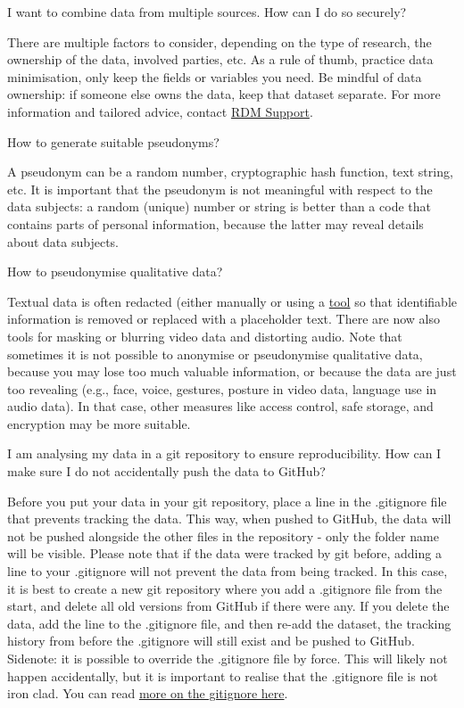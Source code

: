 \documentclass[
]{book}
\begin{document}
I want to combine data from multiple sources. How can I do so securely?

There are multiple factors to consider, depending on the type of research, the ownership of the data, involved parties, etc. As a rule of thumb, practice data minimisation, only keep the fields or variables you need. Be mindful of data ownership: if someone else owns the data, keep that dataset separate. For more information and tailored advice, contact \href{https://www.uu.nl/en/research/research-data-management/contact-us}{RDM Support}.

How to generate suitable pseudonyms?

A pseudonym can be a random number, cryptographic hash function, text string, etc. It is important that the pseudonym is not meaningful with respect to the data subjects: a random (unique) number or string is better than a code that contains parts of personal information, because the latter may reveal details about data subjects.

How to pseudonymise qualitative data?

Textual data is often redacted (either manually or using a \href{https://github.com/UtrechtUniversity/privacy-engineering-tools/tree/main/deidentification}{tool} so that identifiable information is removed or replaced with a placeholder text. There are now also tools for masking or blurring video data and distorting audio. Note that sometimes it is not possible to anonymise or pseudonymise qualitative data, because you may lose too much valuable information, or because the data are just too revealing (e.g., face, voice, gestures, posture in video data, language use in audio data). In that case, other measures like access control, safe storage, and encryption may be more suitable.

I am analysing my data in a git repository to ensure reproducibility. How can I make sure I do not accidentally push the data to GitHub?

Before you put your data in your git repository, place a line in the .gitignore file that prevents tracking the data. This way, when pushed to GitHub, the data will not be pushed alongside the other files in the repository - only the folder name will be visible. Please note that if the data were tracked by git before, adding a line to your .gitignore will not prevent the data from being tracked. In this case, it is best to create a new git repository where you add a .gitignore file from the start, and delete all old versions from GitHub if there were any. If you delete the data, add the line to the .gitignore file, and then re-add the dataset, the tracking history from before the .gitignore will still exist and be pushed to GitHub. Sidenote: it is possible to override the .gitignore file by force. This will likely not happen accidentally, but it is important to realise that the .gitignore file is not iron clad. You can read \href{https://the-turing-way.netlify.app/project-design/sdpw/pd-sdp-sensitive-files.html}{more on the gitignore here}.
\end{document}
